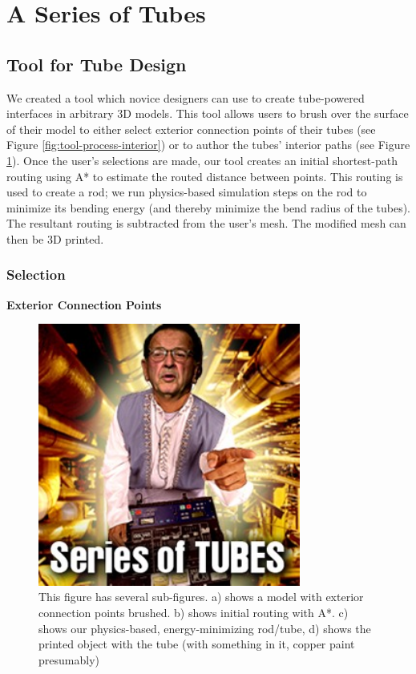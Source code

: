 \section{A Series of Tubes}

\subsection{Tool for Tube Design}

We created a tool which novice designers can use to create tube-powered interfaces in arbitrary 3D models.  This tool allows users to brush over the surface of their model to either select exterior connection points of their tubes (see Figure \ref{fig:tool-process-interior}) or to author the tubes' interior paths (see Figure \ref{fig:tool-process-exterior}).  Once the user's selections are made, our tool creates an initial shortest-path routing using A* to estimate the routed distance between points.  This routing is used to create a rod; we run physics-based simulation steps on the rod to minimize its bending energy (and thereby minimize the bend radius of the tubes).  The resultant routing is subtracted from the user's mesh.  The modified mesh can then be 3D printed.

\subsubsection{Selection}

\textbf{Exterior Connection Points}

\begin{figure}[h!]
\centering
    \includegraphics[width=3.4in]{figures/series-of-tubes.jpg}
\caption{This figure has several sub-figures.  a) shows a model with exterior connection points brushed.  b) shows initial routing with A*.  c) shows our physics-based, energy-minimizing rod/tube, d) shows the printed object with the tube (with something in it, copper paint presumably)}
\label{fig:tool-process-exterior}
\end{figure}

